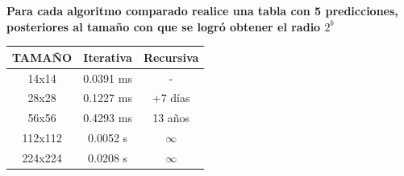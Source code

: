 \documentclass{article}
\begin{document}
\begin{question}
  \textbf{Para cada algoritmo comparado realice una tabla con 5 predicciones, posteriores al tamaño con que se logró obtener el radio $2^{b}$}
  \begin{center}
    \begin{tabular}{||c c c||} 
      \hline
      TAMAÑO & Iterativa & Recursiva \\ [0.5ex] 
      \hline
      14x14 & 0.0391 ms & - \\
      \hline
      28x28 & 0.1227 ms & +7 días \\
      \hline
      56x56 & 0.4293 ms & 13 años \\
      \hline
      112x112 & 0.0052 s & $\infty$ \\
      \hline
      224x224 & 0.0208 s & $\infty$ \\
      \hline
    \end{tabular}
  \end{center}
\end{question}
\end{document}
